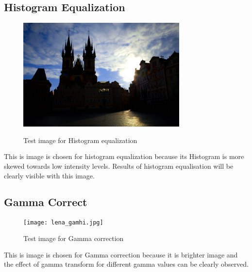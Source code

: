 \documentclass{article}
\begin{document}
\subsection{Histogram Equalization}
\begin{figure}[htb]

\begin{minipage}[b]{1.0\linewidth}
  \centering
  \centerline{\includegraphics[width=8.5cm]{church.png}}
  \centerline{Test image for Histogram equalization\cite{WEBSITE:13}}\medskip
\end{minipage}
%
\end{figure}
This is image is chosen for histogram equalization because its Histogram is more skewed towards low intensity levels. Results of histogram equalisation will be clearly visible with this image.

\subsection{Gamma Correct}
\begin{figure}[htb]

\begin{minipage}[b]{1.0\linewidth}
  \centering
  \centerline{\texttt{[image: lena\_gamhi.jpg]}}
  \centerline{Test image for Gamma correction\cite{WEBSITE:12}}\medskip
\end{minipage}
%
\end{figure}
This is image is chosen for Gamma correction because it is brighter image and the effect of gamma transform for different gamma values can be clearly observed.
\end{document}

